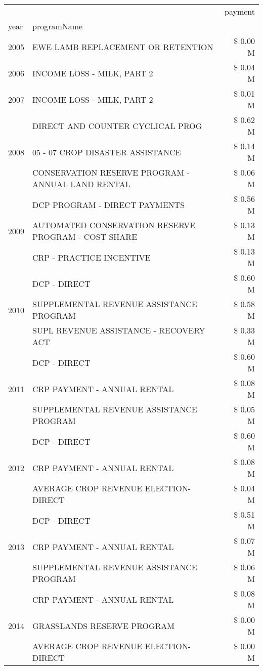 \begin{tabular}{llr}
\toprule
 &  & payment \\
year & programName &  \\
\midrule
2005 & EWE LAMB REPLACEMENT OR RETENTION & \$ 0.00 M \\
\cline{1-3}
2006 & INCOME LOSS - MILK, PART 2 & \$ 0.04 M \\
\cline{1-3}
2007 & INCOME LOSS - MILK, PART 2 & \$ 0.01 M \\
\cline{1-3}
\multirow[t]{3}{*}{2008} & DIRECT AND COUNTER CYCLICAL PROG & \$ 0.62 M \\
 & 05 - 07 CROP DISASTER ASSISTANCE & \$ 0.14 M \\
 & CONSERVATION RESERVE PROGRAM - ANNUAL LAND RENTAL & \$ 0.06 M \\
\cline{1-3}
\multirow[t]{3}{*}{2009} & DCP PROGRAM - DIRECT PAYMENTS & \$ 0.56 M \\
 & AUTOMATED CONSERVATION RESERVE PROGRAM - COST SHARE & \$ 0.13 M \\
 & CRP - PRACTICE INCENTIVE & \$ 0.13 M \\
\cline{1-3}
\multirow[t]{3}{*}{2010} & DCP - DIRECT & \$ 0.60 M \\
 & SUPPLEMENTAL REVENUE ASSISTANCE PROGRAM & \$ 0.58 M \\
 & SUPL REVENUE ASSISTANCE - RECOVERY ACT & \$ 0.33 M \\
\cline{1-3}
\multirow[t]{3}{*}{2011} & DCP - DIRECT & \$ 0.60 M \\
 & CRP PAYMENT - ANNUAL RENTAL & \$ 0.08 M \\
 & SUPPLEMENTAL REVENUE ASSISTANCE PROGRAM & \$ 0.05 M \\
\cline{1-3}
\multirow[t]{3}{*}{2012} & DCP - DIRECT & \$ 0.60 M \\
 & CRP PAYMENT - ANNUAL RENTAL & \$ 0.08 M \\
 & AVERAGE CROP REVENUE ELECTION-DIRECT & \$ 0.04 M \\
\cline{1-3}
\multirow[t]{3}{*}{2013} & DCP - DIRECT & \$ 0.51 M \\
 & CRP PAYMENT - ANNUAL RENTAL & \$ 0.07 M \\
 & SUPPLEMENTAL REVENUE ASSISTANCE PROGRAM & \$ 0.06 M \\
\cline{1-3}
\multirow[t]{3}{*}{2014} & CRP PAYMENT - ANNUAL RENTAL & \$ 0.08 M \\
 & GRASSLANDS RESERVE PROGRAM & \$ 0.00 M \\
 & AVERAGE CROP REVENUE ELECTION-DIRECT & \$ 0.00 M \\

\end{tabular}
